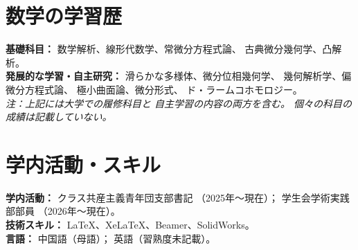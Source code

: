 \documentclass[10pt,a4paper]{article}
\begin{document}
\section*{数学の学習歴}

\textbf{基礎科目：}
数学解析、線形代数学、常微分方程式論、
古典微分幾何学、凸解析。\\

\textbf{発展的な学習・自主研究：}
滑らかな多様体、微分位相幾何学、
幾何解析学、偏微分方程式論、
極小曲面論、微分形式、
ド・ラームコホモロジー。\\

\emph{
注：上記には大学での履修科目と
自主学習の内容の両方を含む。
個々の科目の成績は記載していない。
}

\section*{学内活動・スキル}

\textbf{学内活動：}
クラス共産主義青年団支部書記
（2025年～現在）；
学生会学術実践部部員
（2026年～現在）。\\

\textbf{技術スキル：}
LaTeX、XeLaTeX、Beamer、SolidWorks。\\

\textbf{言語：}
中国語（母語）；
英語（習熟度未記載）。
\end{document}
